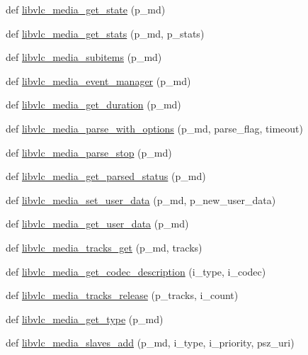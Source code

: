 \begin{DoxyCompactItemize}
\item 
def \hyperlink{namespacevlc_a08910af5cb2ffede600654c5a567ab85}{libvlc\+\_\+media\+\_\+get\+\_\+state} (p\+\_\+md)
\item 
def \hyperlink{namespacevlc_a8bf54d145e8e2f4b0de4a3981be8fe66}{libvlc\+\_\+media\+\_\+get\+\_\+stats} (p\+\_\+md, p\+\_\+stats)
\item 
def \hyperlink{namespacevlc_a344d49b0fc84dc1cfa63ab5d03872d5f}{libvlc\+\_\+media\+\_\+subitems} (p\+\_\+md)
\item 
def \hyperlink{namespacevlc_a2b3476422efeca7d595d8371533eaa58}{libvlc\+\_\+media\+\_\+event\+\_\+manager} (p\+\_\+md)
\item 
def \hyperlink{namespacevlc_a44fa6ccd1bf97cbb7229bbc23903752d}{libvlc\+\_\+media\+\_\+get\+\_\+duration} (p\+\_\+md)
\item 
def \hyperlink{namespacevlc_ac6734416f4493c5b44911e1ad49d0444}{libvlc\+\_\+media\+\_\+parse\+\_\+with\+\_\+options} (p\+\_\+md, parse\+\_\+flag, timeout)
\item 
def \hyperlink{namespacevlc_ad065972236e02109d2814383f5dfaaf8}{libvlc\+\_\+media\+\_\+parse\+\_\+stop} (p\+\_\+md)
\item 
def \hyperlink{namespacevlc_a54f57e0bca8341f88e32cc2eb5b2b419}{libvlc\+\_\+media\+\_\+get\+\_\+parsed\+\_\+status} (p\+\_\+md)
\item 
def \hyperlink{namespacevlc_affc60076c09dcc9f852525c10e09c095}{libvlc\+\_\+media\+\_\+set\+\_\+user\+\_\+data} (p\+\_\+md, p\+\_\+new\+\_\+user\+\_\+data)
\item 
def \hyperlink{namespacevlc_ad55abeb96ec792844832bd7fd31ac0ed}{libvlc\+\_\+media\+\_\+get\+\_\+user\+\_\+data} (p\+\_\+md)
\item 
def \hyperlink{namespacevlc_a0698f7a1ab5f3f3c2d408c42530720dc}{libvlc\+\_\+media\+\_\+tracks\+\_\+get} (p\+\_\+md, tracks)
\item 
def \hyperlink{namespacevlc_a9f7b1ab0dd2f4efbdd9f1d9fd8cf5fc9}{libvlc\+\_\+media\+\_\+get\+\_\+codec\+\_\+description} (i\+\_\+type, i\+\_\+codec)
\item 
def \hyperlink{namespacevlc_a4fbc816f9ca8c1b1033c24404d555e23}{libvlc\+\_\+media\+\_\+tracks\+\_\+release} (p\+\_\+tracks, i\+\_\+count)
\item 
def \hyperlink{namespacevlc_a0c521348122d78764b8a4e7cae989a7f}{libvlc\+\_\+media\+\_\+get\+\_\+type} (p\+\_\+md)
\item 
def \hyperlink{namespacevlc_a1982967514b4a8cb9ac19f3edbdc4702}{libvlc\+\_\+media\+\_\+slaves\+\_\+add} (p\+\_\+md, i\+\_\+type, i\+\_\+priority, psz\+\_\+uri)

\end{DoxyCompactItemize}
